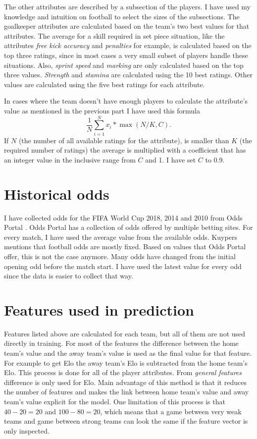 The other attributes are described by a subsection of the players. I have used my knowledge and intuition on football to select the sizes of the subsections. The goalkeeper attributes are calculated based on the team's two best values for that attributes. The average for a skill required in set piece situation, like the attributes \textit{free kick accuracy} and \textit{penalties} for example, is calculated based on the top three ratings, since in most cases a very small subset of players handle these situations. Also, \textit{sprint speed} and \textit{marking} are only calculated based on the top three values. \textit{Strength} and \textit{stamina} are calculated using the 10 best ratings. Other values are calculated using the five best ratings for each attribute.

In cases where the team doesn't have enough players to calculate the attribute's value as mentioned in the previous part I have used this formula
\begin{equation}
\frac{1}{N}\sum_{i=1}^{N}x_i * \max{(N/K, C)}.
\end{equation}
If $N$ (the number of all available ratings for the attribute), is smaller than $K$ (the required number of ratings) the average is multiplied with a coefficient that has an integer value in the inclusive range from $C$ and 1. I have set $C$ to 0.9.

\section{Historical odds}
I have collected odds for the FIFA World Cup 2018, 2014 and 2010 from Odds Portal \cite{oddsportal}. Odds Portal has a collection of odds offered by multiple betting sites. For every match, I have used the average value from the available odds. Kuypers \cite{kuypers2008} mentions that football odds are mostly fixed. Based on values that Odds Portal offer, this is not the case anymore. Many odds have changed from the initial opening odd before the match start. I have used the latest value for every odd since the data is easier to collect that way.

\section{Features used in prediction}
Features listed above are calculated for each team, but all of them are not used directly in training. For most of the features the difference between the home team's value and the away team's value is used as the final value for that feature. For example to get Elo the away team's Elo is subtracted from the home team's Elo. This process is done for all of the player attributes. From \textit{general features} difference is only used for Elo. Main advantage of this method is that it reduces the number of features and makes the link between home team's value and away team's value explicit for the model. One limitation of this process is that $40-20=20$ and $100-80=20$, which means that a game between very weak teams and game between strong teams can look the same if the feature vector is only inspected.

